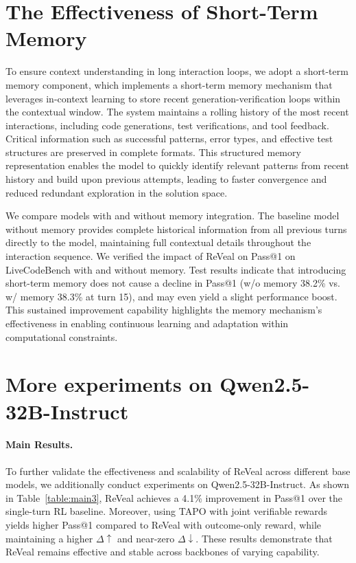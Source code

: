 \documentclass{article} %
\begin{document}
\section{The Effectiveness of Short-Term Memory} 
\label{app: memory}
To ensure context understanding in long interaction loops, we adopt a short-term memory component, which implements a short-term memory mechanism that leverages in-context learning to store recent generation-verification loops within the contextual window. The system maintains a rolling history of the most recent interactions, including code generations, test verifications, and tool feedback. Critical information such as successful patterns, error types, and effective test structures are preserved in complete formats. This structured memory representation enables the model to quickly identify relevant patterns from recent history and build upon previous attempts, leading to faster convergence and reduced redundant exploration in the solution space.

We compare models with and without memory integration. The baseline model without memory provides complete historical information from all previous turns directly to the model, maintaining full contextual details throughout the interaction sequence. We verified the impact of ReVeal on Pass@1 on LiveCodeBench with and without memory. Test results indicate that introducing short-term memory does not cause a decline in Pass@1 (w/o memory 38.2\% vs. w/ memory 38.3\% at turn 15), and may even yield a slight performance boost. This sustained improvement capability highlights the memory mechanism's effectiveness in enabling continuous learning and adaptation within computational constraints.

\section{More experiments on Qwen2.5-32B-Instruct}
\label{sec:qwen32b_more}

\paragraph{Main Results.}
To further validate the effectiveness and scalability of ReVeal across different base models, we additionally conduct experiments on Qwen2.5-32B-Instruct. As shown in Table~\ref{table:main3}, ReVeal achieves a 4.1\% improvement in Pass@1 over the single-turn RL baseline. Moreover, using TAPO with joint verifiable rewards yields higher Pass@1 compared to ReVeal with outcome-only reward, while maintaining a higher $\Delta\uparrow$ and near-zero $\Delta\downarrow$. These results demonstrate that ReVeal remains effective and stable across backbones of varying capability.
\end{document}
